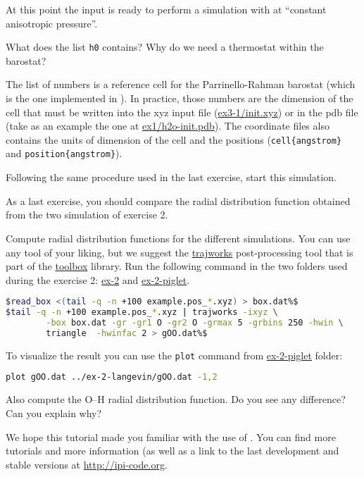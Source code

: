 \documentclass{article}
\begin{document}
\begin{Exercise}[label={inputs},title={PIMD-NPT simulation of ice}]
At this point the input is ready to perform a simulation with at
``constant anisotropic pressure''.

\Question
What does the list \texttt{h0} contains? Why do we need a thermostat
within the barostat?

The list of numbers is a reference cell for the Parrinello-Rahman
barostat (which is the one implemented in \ipi). In practice, those
numbers are the dimension of the cell that must be written into the xyz
input file (\url{ex3-1/init.xyz}) or in the pdb file (take as an
example the one at \url{ex1/h2o-init.pdb}). The coordinate files
also contains the units of dimension of the cell and the positions
(\texttt{cell\{angstrom\}} and \texttt{position\{angstrom\}}).

\Question
Following the same procedure used in the last exercise, start this
simulation.

\end{Exercise}

\begin{Exercise}[label={inputs},title={Radial distribution function comparison}]
As a last exercise, you should compare the radial distribution
function obtained from the two simulation of exercise 2.

\Question
Compute radial distribution functions for the different simulations. You
can use any tool of your liking, but we suggest the \url{trajworks}
post-processing tool that is part of the \url{toolbox} library.
Run the following command in the two folders used during the exercise
2: \url{ex-2} and \url{ex-2-piglet}.
\begin{lstlisting}[language=bash]
$read_box <(tail -q -n +100 example.pos_*.xyz) > box.dat%$
$tail -q -n +100 example.pos_*.xyz | trajworks -ixyz \
        -box box.dat -gr -gr1 O -gr2 O -grmax 5 -grbins 250 -hwin \
        triangle  -hwinfac 2 > gOO.dat%$
\end{lstlisting}

To visualize the result you can use the \texttt{plot} command from
\url{ex-2-piglet} folder:
\begin{lstlisting}[language=bash]
plot gOO.dat ../ex-2-langevin/gOO.dat -1,2
\end{lstlisting}
Also compute the O--H radial distribution function.
Do you see any difference? Can you explain why?

\end{Exercise}

We hope this tutorial made you familiar with the use of \ipi. You
can find more tutorials and more information (as well as a link to the
last development and stable versions at \url{http://ipi-code.org}.


%
%
\end{document}
